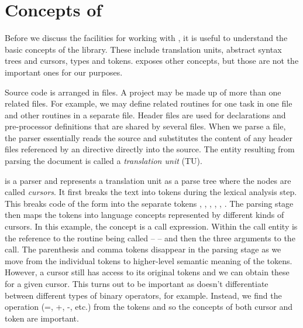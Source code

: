\section[Concepts of libclang]{Concepts of \libclang}\label{sec:libclangConcepts}

Before we discuss the \R{} facilities for working with \libclang, it
is useful to understand the basic concepts of the library.  These
include translation units, abstract syntax trees and cursors, types
and tokens.  \libclang{} exposes other concepts, but those are not  the
important ones for our purposes.

Source code is arranged in files. A project may be made up of more
than one related files. %
For example, we may define related routines
for one task in one file and other routines in a separate file.
Header files are used for declarations and pre-processor definitions
that are shared by several files.  When we parse a file, the parser
essentially reads the source and substitutes the content of any header
files referenced by an  directive directly into
the source.  The entity resulting from parsing the document is called
a \textit{translation unit} (TU).


\libclang{} is a parser and represents a translation unit as a parse
tree where the nodes are called \textit{cursors}.  It first breaks the
text into tokens during the lexical analysis step.  This breaks code
of the form  into the separate tokens
, \dquote{(}, , , ,
\dquote{)}.  The parsing stage then maps the tokens into language
concepts represented by different kinds of cursors.  In this example,
the concept is a call expression. Within the call entity is the
reference to the routine being called --  -- and then the
three arguments to the call.  The parenthesis and comma tokens
disappear in the parsing stage as we move from the individual tokens
to higher-level semantic meaning of the tokens.  However, a cursor
still has access to its original tokens and we can obtain these for a
given cursor. This turns out to be important as \libclang{} doesn't
differentiate between different types of binary operators, for
example. Instead, we find the operation (=, +, -, etc.)  from the
tokens and so the concepts of both cursor and token are important.

